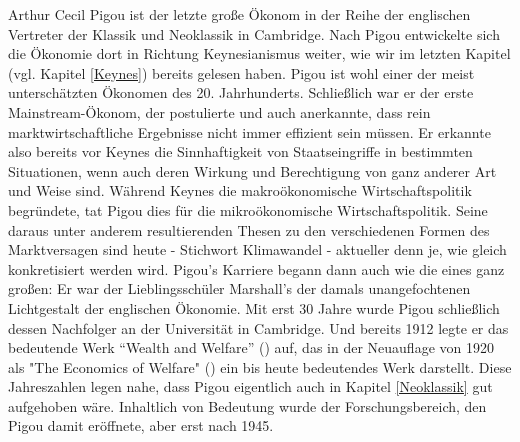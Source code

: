 Arthur Cecil Pigou ist der letzte große Ökonom in der Reihe der englischen Vertreter der Klassik und Neoklassik in Cambridge. Nach Pigou entwickelte sich die Ökonomie dort in Richtung Keynesianismus weiter, wie wir im letzten Kapitel (vgl. Kapitel \ref{Keynes}) bereits gelesen haben. Pigou ist wohl einer der meist unterschätzten Ökonomen des 20. Jahrhunderts. Schließlich war er der erste Mainstream-Ökonom, der postulierte und auch anerkannte, dass rein marktwirtschaftliche Ergebnisse nicht immer effizient sein müssen. Er erkannte also bereits vor Keynes die Sinnhaftigkeit von Staatseingriffe in bestimmten Situationen, wenn auch deren Wirkung und Berechtigung von ganz anderer Art und Weise sind. Während Keynes die makroökonomische Wirtschaftspolitik begründete, tat Pigou dies für die mikroökonomische Wirtschaftspolitik. Seine daraus unter anderem resultierenden Thesen zu den verschiedenen Formen des Marktversagen sind heute - Stichwort Klimawandel - aktueller denn je, wie gleich konkretisiert werden wird. Pigou's Karriere begann dann auch wie die eines ganz großen: Er war der Lieblingsschüler Marshall's der damals unangefochtenen Lichtgestalt der englischen Ökonomie. Mit erst 30 Jahre wurde Pigou schließlich dessen Nachfolger an der Universität in Cambridge. Und bereits 1912 legte er das bedeutende Werk "`Wealth and Welfare"' (\parencite{Pigou1912}) auf, das in der Neuauflage von 1920 als "The Economics of Welfare" (\parencite{Pigou1920}) ein bis heute bedeutendes Werk darstellt. Diese Jahreszahlen legen nahe, dass Pigou eigentlich auch in Kapitel \ref{Neoklassik} gut aufgehoben wäre. Inhaltlich von Bedeutung wurde der Forschungsbereich, den Pigou damit eröffnete, aber erst nach 1945. 

